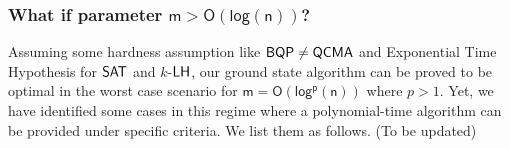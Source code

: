 \documentclass[11pt]{article}
\begin{document}
\subsubsection{What if parameter $\mathsf{m > O(log(n))}$?} \label{heuristics}
Assuming some hardness assumption like $\mathsf{BQP}\neq \mathsf{QCMA}$ and Exponential Time Hypothesis for $\mathsf{SAT}$ and $k$-$\mathsf{LH}$, our ground state algorithm can be proved to be optimal in the worst case scenario for $\mathsf{m = O(log^p(n))}$ where $p>1$. Yet, we have identified some cases in this regime where a polynomial-time algorithm can be provided under specific criteria. We list them as follows.
(To be updated)

\end{document}
